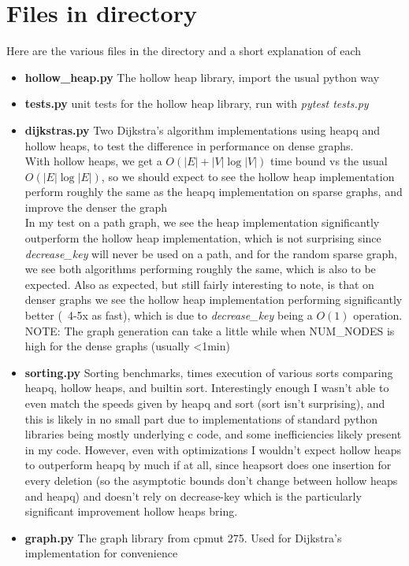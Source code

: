 \documentclass[10pt]{article}
\begin{document}
\section*{Files in directory}
Here are the various files in the directory and a short explanation of each
\begin{itemize}
    \item \textbf{hollow\_heap.py}
        The hollow heap library, import the usual python way
    \item \textbf{tests.py}
        unit tests for the hollow heap library, run with \emph{pytest tests.py}
    \item \textbf{dijkstras.py}
        Two Dijkstra's algorithm implementations using heapq and hollow heaps, to test the difference in performance on dense graphs.\\
        With hollow heaps, we get a $O(|E|+|V|\log |V|)$ time bound vs the usual $O(|E|\log |E|)$, so we should expect to see the hollow heap implementation perform roughly the same as the heapq implementation on sparse graphs, and improve the denser the graph\\
        In my test on a path graph, we see the heap implementation significantly outperform the hollow heap implementation, which is not surprising since \emph{decrease\_key} will never be used on a path, and for the random sparse graph, we see both algorithms performing roughly the same, which is also to be expected. Also as expected, but still fairly interesting to note, is that on denser graphs we see the hollow heap implementation performing significantly better (~4-5x as fast), which is due to \emph{decrease\_key} being a $O(1)$ operation.\\
        NOTE: The graph generation can take a little while when NUM\_NODES is high for the dense graphs (usually <1min)\\
    \item \textbf{sorting.py}
        Sorting benchmarks, times execution of various sorts comparing heapq, hollow heaps, and builtin sort. Interestingly enough I wasn't able to even match the speeds given by heapq and sort (sort isn't surprising), and this is likely in no small part due to implementations of standard python libraries being mostly underlying c code, and some inefficiencies likely present in my code. However, even with optimizations I wouldn't expect hollow heaps to outperform heapq by much if at all, since heapsort does one insertion for every deletion (so the asymptotic bounds don't change between hollow heaps and heapq) and doesn't rely on decrease-key which is the particularly significant improvement hollow heaps bring.
    \item \textbf{graph.py}
        The graph library from cpmut 275. Used for Dijkstra's implementation for convenience

\end{itemize}
\end{document}
